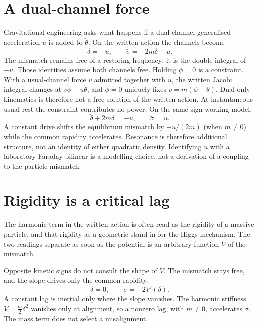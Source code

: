 \documentclass[a4paper]{article}
\begin{document}
\section{A dual-channel force}

Gravitational engineering asks what happens if a dual-channel generalised acceleration \(u\) is added to \(\ddot\theta\). On the written action the channels become
\begin{equation}
\ddot\delta=-u,\qquad \ddot\sigma=-2m\delta+u.
\end{equation}
The mismatch remains free of a restoring frequency: it is the double integral of \(-u\). Those identities assume both channels free. Holding \(\ddot\phi=0\) is a constraint. With a usual-channel force \(v\) admitted together with \(u\), the written Jacobi integral changes at \(v\dot\phi-u\dot\theta\), and \(\ddot\phi=0\) uniquely fixes \(v=m(\phi-\theta)\). Dual-only kinematics is therefore not a free solution of the written action. At instantaneous usual rest the constraint contributes no power. On the same-sign working model,
\begin{equation}
\ddot\delta+2m\delta=-u,\qquad \ddot\sigma=u.
\end{equation}
A constant drive shifts the equilibrium mismatch by \(-u/(2m)\) (when \(m\neq 0\)) while the common rapidity accelerates. Resonance is therefore additional structure, not an identity of either quadratic density. Identifying \(u\) with a laboratory Faraday bilinear is a modelling choice, not a derivation of a coupling to the particle mismatch.

\section{Rigidity is a critical lag}

The harmonic term in the written action is often read as the rigidity of a massive particle, and that rigidity as a geometric stand-in for the Higgs mechanism. The two readings separate as soon as the potential is an arbitrary function \(V\) of the mismatch.

Opposite kinetic signs do not consult the shape of \(V\). The mismatch stays free, and the slope drives only the common rapidity:
\[
\ddot\delta=0,\qquad\ddot\sigma=-2V'(\delta).
\]
A constant lag is inertial only where the slope vanishes. The harmonic stiffness \(V=\frac m2\delta^2\) vanishes only at alignment, so a nonzero lag, with \(m\neq 0\), accelerates \(\sigma\). The mass term does not select a misalignment.
\end{document}
